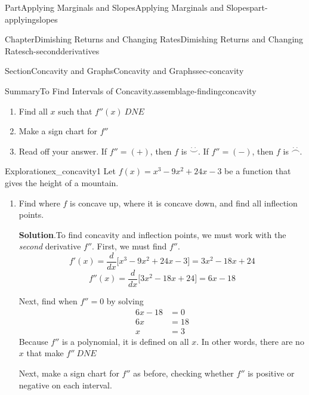\documentclass{tufte-book}
\newcommand{\blocktitlefont}{\relax}
\numberwithin{equation}{chapter}
\newcommand{\ddx}[1]{ \dfrac{d}{dx} \Big[ #1 \Big]  }
\newcommand{\amp}{&}
\begin{document}
\begin{partptx}{Part}{Applying Marginals and Slopes}{}{Applying Marginals and Slopes}{}{}{part-applyingslopes}
\begin{chapterptx}{Chapter}{Dimishing Returns and Changing Rates}{}{Dimishing Returns and Changing Rates}{}{}{ch-secondderivatives}
\begin{sectionptx}{Section}{Concavity and Graphs}{}{Concavity and Graphs}{}{}{sec-concavity}
\begin{assemblage}{Summary}{To Find Intervals of Concavity.}{assemblage-findingconcavity}
\begin{enumerate}
\item{}Find all \(x\) such that \(f''(x)\ DNE\)%
\item{}Make a sign chart for \(f''\)%
\item{}Read off your answer.  If \(f''=(+)\), then \(f\) is \(\stackrel{\cdot\,\cdot}{\smile}\).  If \(f''=(-)\), then \(f\) is \(\stackrel{\cdot\,\cdot}{\frown}\).%
\end{enumerate}
%
\end{assemblage}
\begin{exploration}{Exploration}{}{ex_concavity1}%
Let \(f(x) = x^3 - 9x^2 + 24x - 3 \) be a function that gives the height of a mountain.%
\begin{enumerate}[font=\bfseries,label=(\alph*),ref=\alph*]%
\item{}Find where \(f\) is concave up, where it is concave down, and find all inflection points.%
\par\smallskip%
\noindent\textbf{\blocktitlefont Solution}.\hypertarget{ex_concavity1-2-2}{}\quad{}To find concavity and inflection points, we must work with the \emph{second} derivative \(f''\). First, we must find \(f''\).%
\begin{equation*}
f'(x) = \ddx{x^3 - 9x^2 + 24x - 3 } = 3x^2 -18x +24
\end{equation*}
%
\begin{equation*}
f''(x) = \ddx{3x^2 -18x +24} = 6x - 18
\end{equation*}
%
\par
Next, find when \(f''=0\) by solving%
\begin{align*}
6x-18 \amp =0\\
6x    \amp =18\\
x 	\amp =3
\end{align*}
Because \(f''\) is a polynomial, it is defined on all \(x\).  In other words, there are no \(x\) that make \(f''\ DNE\)%
\par
Next, make a sign chart for \(f''\) as before, checking whether  \(f''\) is positive or negative on each interval. \begin{image}{0.25}{0.5}{0.25}{}%
\end{image}
\end{enumerate}
\end{exploration}
\end{sectionptx}
\end{chapterptx}
\end{partptx}
\end{document}
